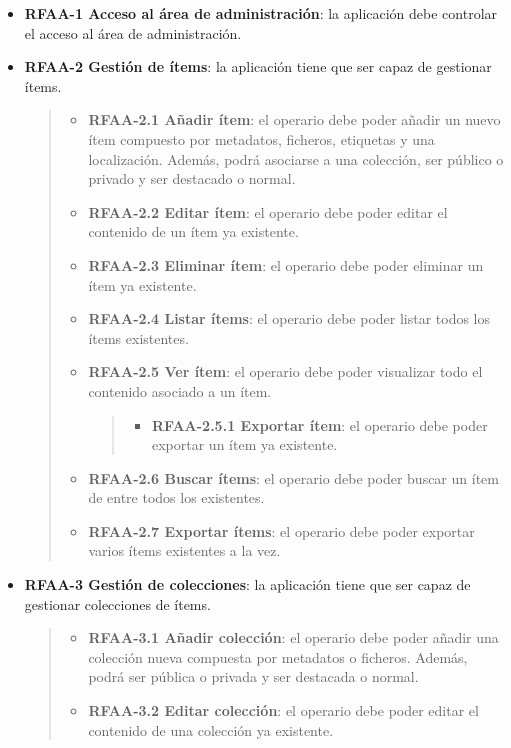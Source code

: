 \documentclass[
]{article}
\providecommand{\tightlist}{%
  \setlength{\itemsep}{0pt}\setlength{\parskip}{0pt}}
\begin{document}
\begin{itemize}
\item
  \textbf{RFAA-1 Acceso al área de administración}: la aplicación debe
  controlar el acceso al área de administración.
\item
  \textbf{RFAA-2 Gestión de ítems}: la aplicación tiene que ser capaz de
  gestionar ítems.

  \begin{quote}
  \begin{itemize}
  \item
    \textbf{RFAA-2.1 Añadir ítem}: el operario debe poder añadir un
    nuevo ítem compuesto por metadatos, ficheros, etiquetas y una
    localización. Además, podrá asociarse a una colección, ser público o
    privado y ser destacado o normal.
  \item
    \textbf{RFAA-2.2 Editar ítem}: el operario debe poder editar el
    contenido de un ítem ya existente.
  \item
    \textbf{RFAA-2.3 Eliminar ítem}: el operario debe poder eliminar un
    ítem ya existente.
  \item
    \textbf{RFAA-2.4 Listar ítems}: el operario debe poder listar todos
    los ítems existentes.
  \item
    \textbf{RFAA-2.5 Ver ítem}: el operario debe poder visualizar todo
    el contenido asociado a un ítem.

    \begin{quote}
    \begin{itemize}
    \tightlist
    \item
      \textbf{RFAA-2.5.1 Exportar ítem}: el operario debe poder exportar
      un ítem ya existente.
    \end{itemize}
    \end{quote}
  \item
    \textbf{RFAA-2.6 Buscar ítems}: el operario debe poder buscar un
    ítem de entre todos los existentes.
  \item
    \textbf{RFAA-2.7 Exportar ítems}: el operario debe poder exportar
    varios ítems existentes a la vez.
  \end{itemize}
  \end{quote}
\item
  \textbf{RFAA-3 Gestión de colecciones}: la aplicación tiene que ser
  capaz de gestionar colecciones de ítems.

  \begin{quote}
  \begin{itemize}
  \item
    \textbf{RFAA-3.1 Añadir colección}: el operario debe poder añadir
    una colección nueva compuesta por metadatos o ficheros. Además,
    podrá ser pública o privada y ser destacada o normal.
  \item
    \textbf{RFAA-3.2 Editar colección}: el operario debe poder editar el
    contenido de una colección ya existente.


\end{itemize}
\end{quote}
\end{itemize}
\end{document}
